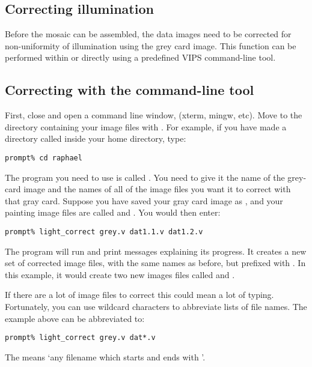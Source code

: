 \subsection{Correcting illumination}

Before the mosaic can be assembled, the data images need to be corrected for
non-uniformity of illumination using the grey card image. This function can be
performed within \nip{} or directly using a predefined VIPS command-line tool.

\subsection{Correcting with the command-line tool}

First, close \nip{} and open a command line window, (xterm, mingw, etc). Move
to the directory containing your image files with . For example, if you
have made a directory called  inside your home directory, type:

\begin{verbatim}
prompt% cd raphael
\end{verbatim}

The program you need to use is called . You need to give
it the name of the grey-card image and the names of all of the image files
you want it to correct with that gray card.  Suppose you have saved your
gray card image as , and your painting image files are called
 and . You would then enter:

\begin{verbatim}
prompt% light_correct grey.v dat1.1.v dat1.2.v
\end{verbatim}

The program will run and print messages explaining its progress. It creates
a new set of corrected image files, with the same names as before, but
prefixed with . In this example, it would create two new images files
called  and .

If there are a lot of image files to correct this could mean a lot of typing.
Fortunately, you can use wildcard characters to abbreviate lists of file
names. The example above can be abbreviated to:

\begin{verbatim}
prompt% light_correct grey.v dat*.v
\end{verbatim}

\noindent
The  means `any filename which starts  and ends with
'. 

